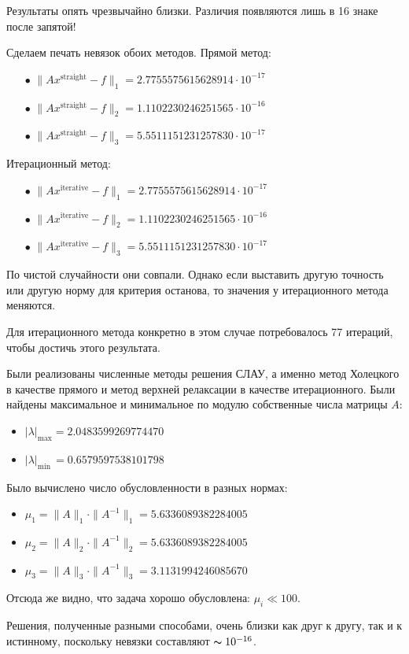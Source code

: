 		\newpage
	
		Результаты опять чрезвычайно близки. Различия появляются лишь в 16 знаке после запятой!
		
		Сделаем печать невязок обоих методов. Прямой метод:
		\begin{itemize}
			\item[$\bullet$] $\|Ax^\text{straight} - f\|_1 = 2.7755575615628914 \cdot 10^{-17}$ 
			
			\item[$\bullet$] $\|Ax^\text{straight} - f\|_2 = 1.1102230246251565 \cdot 10^{-16}$
			
			\item[$\bullet$] $\|Ax^\text{straight} - f\|_3 = 5.5511151231257830 \cdot 10^{-17}$
		\end{itemize}
	
		Итерационный метод:
		\begin{itemize}
			\item[$\bullet$] $\|Ax^\text{iterative} - f\|_1 = 2.7755575615628914 \cdot 10^{-17}$ 
			
			\item[$\bullet$] $\|Ax^\text{iterative} - f\|_2 = 1.1102230246251565 \cdot 10^{-16}$
			
			\item[$\bullet$] $\|Ax^\text{iterative} - f\|_3 = 5.5511151231257830 \cdot 10^{-17}$
		\end{itemize}
	
		По чистой случайности они совпали. Однако если выставить другую точность или другую норму для критерия останова, то значения у итерационного метода меняются.
		
		Для итерационного метода конкретно в этом случае потребовалось 77 итераций, чтобы достичь этого результата.
		
		
		\newpage
		
		Были реализованы численные методы решения СЛАУ, а именно метод Холецкого в качестве прямого и метод верхней релаксации в качестве итерационного. Были найдены максимальное и минимальное по модулю собственные числа матрицы $A$:
		\begin{itemize}
			\item $|\lambda|_\text{max} = 2.0483599269774470$
			
			\item $|\lambda|_\text{min} \, = 0.6579597538101798$
		\end{itemize}
		
		Было вычислено число обусловленности в разных нормах:
		\begin{itemize}
			\item $\mu_1 = \|A\|_1 \cdot \|A^{-1}\|_1 = 5.6336089382284005$ 
		
			\item $\mu_2 = \|A\|_2 \cdot \|A^{-1}\|_2 = 5.6336089382284005$ 
		
			\item $\mu_3 = \|A\|_3 \cdot \|A^{-1}\|_3 = 3.1131994246085670$
	
		\end{itemize}
	
		Отсюда же видно, что задача хорошо обусловлена: $\mu_i \ll 100$.
		
		Решения, полученные разными способами, очень близки как друг к другу, так и к истинному, поскольку невязки составляют $\thicksim 10^{-16}$.


